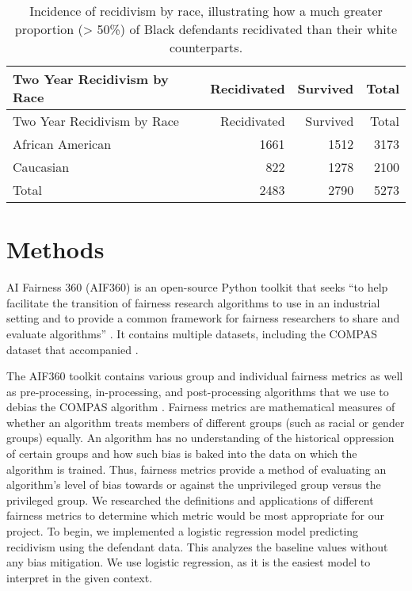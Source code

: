 \documentclass[,article,,moreauthors,pdftex]{mdpi}
\begin{document}
\begin{longtable}[]{@{}lrrr@{}}
\caption{Incidence of recidivism by race, illustrating how a much
greater proportion (\textgreater{} 50\%) of Black defendants recidivated
than their white counterparts. \label{tab:recid table}}\tabularnewline
\toprule
Two Year Recidivism by Race & Recidivated & Survived &
Total\tabularnewline
\midrule
\endfirsthead
\toprule
Two Year Recidivism by Race & Recidivated & Survived &
Total\tabularnewline
\midrule
\endhead
African American & 1661 & 1512 & 3173\tabularnewline
Caucasian & 822 & 1278 & 2100\tabularnewline
Total & 2483 & 2790 & 5273\tabularnewline
\bottomrule
\end{longtable}

\hypertarget{methods}{%
\section{Methods}\label{methods}}

AI Fairness 360 (AIF360) is an open-source Python toolkit that seeks
``to help facilitate the transition of fairness research algorithms to
use in an industrial setting and to provide a common framework for
fairness researchers to share and evaluate algorithms''
\citep{aif360-oct-2018}. It contains multiple datasets, including the
COMPAS dataset that accompanied \citet{angwin2016machine}.

The AIF360 toolkit contains various group and individual fairness
metrics as well as pre-processing, in-processing, and post-processing
algorithms that we use to debias the COMPAS algorithm
\citep{aif360-oct-2018}. Fairness metrics are mathematical measures of
whether an algorithm treats members of different groups (such as racial
or gender groups) equally. An algorithm has no understanding of the
historical oppression of certain groups and how such bias is baked into
the data on which the algorithm is trained. Thus, fairness metrics
provide a method of evaluating an algorithm's level of bias towards or
against the unprivileged group versus the privileged group. We
researched the definitions and applications of different fairness
metrics \citep{ashokan2021fairness} to determine which metric would be
most appropriate for our project. To begin, we implemented a logistic
regression model predicting recidivism using the defendant data. This
analyzes the baseline values without any bias mitigation. We use
logistic regression, as it is the easiest model to interpret in the
given context.
\end{document}
